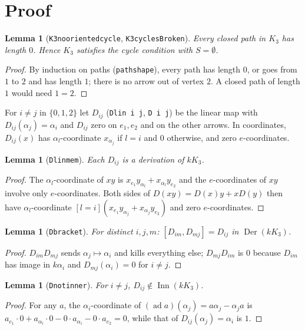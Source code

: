 \documentclass[11pt]{article}
\renewcommand{\_}{\oldus\allowbreak}
\newtheorem{lemma}[theorem]{Lemma}
\theoremstyle{definition}
\theoremstyle{remark}
\newcommand{\Der}{\operatorname{Der}}
\newcommand{\Inn}{\operatorname{Inn}}
\newcommand{\ad}{\operatorname{ad}}
\newcommand{\lean}[1]{\texttt{#1}}
\begin{document}
\section{Proof}

\begin{lemma}[\lean{K3\_no\_oriented\_cycle}, \lean{K3\_cyclesBroken}]
Every closed path in $K_3$ has length $0$. Hence $K_3$ satisfies the cycle condition with
$S = \emptyset$.
\end{lemma}
\begin{proof}
By induction on paths (\lean{path\_shape}), every path has length $0$, or goes from $1$ to $2$
and has length $1$; there is no arrow out of vertex $2$. A closed path of length $1$ would need
$1 = 2$.
\end{proof}

For $i \ne j$ in $\{0,1,2\}$ let $D_{ij}$ (\lean{Dlin i j}, \lean{D i j}) be the linear map with
$D_{ij}(\alpha_j) = \alpha_i$ and $D_{ij}$ zero on $e_1, e_2$ and on the other arrows. In
coordinates, $D_{ij}(x)$ has $\alpha_l$-coordinate $x_{\alpha_j}$ if $l = i$ and $0$ otherwise, and
zero $e$-coordinates.

\begin{lemma}[\lean{Dlin\_mem}]
Each $D_{ij}$ is a derivation of $kK_3$.
\end{lemma}
\begin{proof}
The $\alpha_l$-coordinate of $xy$ is $x_{e_1}y_{\alpha_l} + x_{\alpha_l}y_{e_2}$ and the
$e$-coordinates of $xy$ involve only $e$-coordinates. Both sides of $D(xy) = D(x)y + xD(y)$
then have $\alpha_l$-coordinate $[l=i](x_{e_1}y_{\alpha_j} + x_{\alpha_j}y_{e_2})$ and zero
$e$-coordinates.
\end{proof}

\begin{lemma}[\lean{D\_bracket}]
For distinct $i, j, m$: $[D_{im}, D_{mj}] = D_{ij}$ in $\Der(kK_3)$.
\end{lemma}
\begin{proof}
$D_{im}D_{mj}$ sends $\alpha_j \mapsto \alpha_i$ and kills everything else; $D_{mj}D_{im}$ is $0$
because $D_{im}$ has image in $k\alpha_i$ and $D_{mj}(\alpha_i) = 0$ for $i \ne j$.
\end{proof}

\begin{lemma}[\lean{D\_not\_inner}]
For $i \ne j$, $D_{ij} \notin \Inn(kK_3)$.
\end{lemma}
\begin{proof}
For any $a$, the $\alpha_i$-coordinate of $(\ad a)(\alpha_j) = a\alpha_j - \alpha_j a$ is
$a_{e_1}\cdot 0 + a_{\alpha_i}\cdot 0 - 0\cdot a_{\alpha_i} - 0 \cdot a_{e_2} = 0$, while that of
$D_{ij}(\alpha_j) = \alpha_i$ is $1$.
\end{proof}
\end{document}
